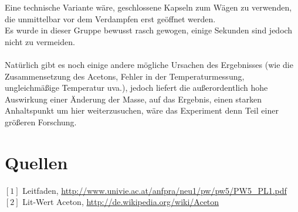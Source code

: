\documentclass[12pt,a4paper]{article}
\begin{document}
\begin{multicols}{2}
Eine technische Variante wäre, geschlossene Kapseln zum Wägen zu verwenden, die unmittelbar vor dem Verdampfen erst geöffnet werden.\\
Es wurde in dieser Gruppe bewusst rasch gewogen, einige Sekunden sind jedoch nicht zu vermeiden.\\
\\
Natürlich gibt es noch einige andere mögliche Ursachen des Ergebnisses (wie die Zusammensetzung des Acetons, Fehler in der Temperaturmessung, ungleichmäßige Temperatur uva.), jedoch liefert die außerordentlich hohe Auswirkung einer Änderung der Masse, auf das Ergebnis, einen starken Anhaltspunkt um hier weiterzusuchen, wäre das Experiment denn Teil einer größeren Forschung.


\section{Quellen}
$[1]$ Leitfaden, \url{http://www.univie.ac.at/anfpra/neu1/pw/pw5/PW5_PL1.pdf}\\
$[2]$ Lit-Wert Aceton, \url{http://de.wikipedia.org/wiki/Aceton}

\end{multicols}
\end{document}
